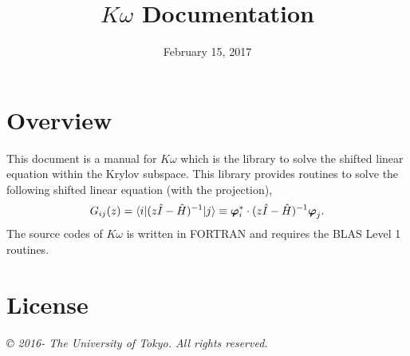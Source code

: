 \documentclass[letterpaper,10pt,dvipdfmx,openany]{sphinxmanual}
\title{$K\omega$ Documentation}
\date{February 15, 2017}
\author{}
\begin{document}
\maketitle
\tableofcontents
{}\label{index::doc}



\chapter{Overview}
\label{komega_overview_en:overview}\label{komega_overview_en::doc}\label{komega_overview_en:welcome-to-s-documentation}
This document is a manual for \(K\omega\) which is the library to
solve the shifted linear equation within the Krylov subspace.
This library provides routines to solve the following shifted linear equation
(with the projection),
\label{komega_overview_en:shiftedeq}\begin{gather}
\begin{split}\begin{align}
  G_{i j}(z) = \langle i | (z {\hat I} -{\hat H})^{-1}| j \rangle \equiv
  {\boldsymbol \varphi}_i^{*} \cdot (z{\hat I}-{\hat H})^{-1} {\boldsymbol \varphi}_j.
  \end{align}\end{split}\notag
\end{gather}
The source codes of \(K\omega\) is written in FORTRAN
and requires the BLAS Level 1 routines.


\chapter{License}
\label{komega_copyright_en::doc}\label{komega_copyright_en:license}
\emph{© 2016- The University of Tokyo. All rights reserved.}
\end{document}
